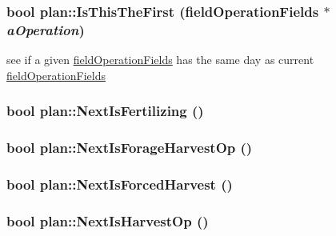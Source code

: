 \label{classplan_ad28041911ab26c91eefbd1105d5922ed}
\hypertarget{classplan_adee3da0790a24dcf45690ab53482e45f}{
\subsubsection[{IsThisTheFirst}]{\setlength{\rightskip}{0pt plus 5cm}bool plan::IsThisTheFirst ({\bf fieldOperationFields} $\ast$ {\em aOperation})}}
\label{classplan_adee3da0790a24dcf45690ab53482e45f}
see if a given \hyperlink{classfield_operation_fields}{fieldOperationFields} has the same day as current \hyperlink{classfield_operation_fields}{fieldOperationFields} \hypertarget{classplan_a0d5099abca46e3a99902a0d333ce8a4d}{
\subsubsection[{NextIsFertilizing}]{\setlength{\rightskip}{0pt plus 5cm}bool plan::NextIsFertilizing ()}}
\label{classplan_a0d5099abca46e3a99902a0d333ce8a4d}
\hypertarget{classplan_aee2a49d25d0d0d0019d0b55465d3e4b1}{
\subsubsection[{NextIsForageHarvestOp}]{\setlength{\rightskip}{0pt plus 5cm}bool plan::NextIsForageHarvestOp ()}}
\label{classplan_aee2a49d25d0d0d0019d0b55465d3e4b1}
\hypertarget{classplan_a5b8c3cccd2e9709b4d64d2910f778f9d}{
\subsubsection[{NextIsForcedHarvest}]{\setlength{\rightskip}{0pt plus 5cm}bool plan::NextIsForcedHarvest ()}}
\label{classplan_a5b8c3cccd2e9709b4d64d2910f778f9d}
\hypertarget{classplan_ad3c70afeed1b7ed1d00046ebbe3db961}{
\subsubsection[{NextIsHarvestOp}]{\setlength{\rightskip}{0pt plus 5cm}bool plan::NextIsHarvestOp ()}}
